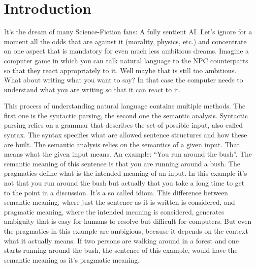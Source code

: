 \documentclass[12pt,twoside]{scrartcl}
\theoremstyle{plain}
\theoremstyle{definition}
\theoremstyle{remark}
\begin{document}


\section{Introduction}
\label{sec:introduction}


	It's the dream of many Science-Fiction fans: A fully sentient AI. Let's ignore for a moment all the odds that are against it (morality, physics, etc.) and concentrate on one aspect that is mandatory for even much less ambitious dreams. Imagine a computer game in which you can talk natural language to the NPC counterparts so that they react appropriately to it. Well maybe that is still too ambitious. What about writing what you want to say? In that case the computer needs to understand what you are writing so that it can react to it.
	
	This process of understanding natural language contains multiple methods. The first one is the syntactic parsing, the second one the semantic analysis. Syntactic parsing relies on a grammar that describes the set of possible input, also called syntax. The syntax specifies what are allowed sentence structures and how these are built.
	The semantic analysis relies on the semantics of a given input. That means what the given input means. An example: ``You run around the bush''. The semantic meaning of this sentence is that you are running around a bush. The pragmatics define what is the intended meaning of an input. In this example it's not that you run around the bush but actually that you take a long time to get to the point in a discussion. It's a so called idiom. This difference between semantic meaning, where just the sentence as it is written is considered, and pragmatic meaning, where the intended meaning is considered, generates ambiguity that is easy for humans to resolve but difficult for computers. But even the pragmatics in this example are ambigious, because it depends on the context what it actually means. If two persons are walking around in a forest and one starts running around the bush, the sentence of this example, would have the semantic meaning as it's pragmatic meaning.
	
\end{document}
